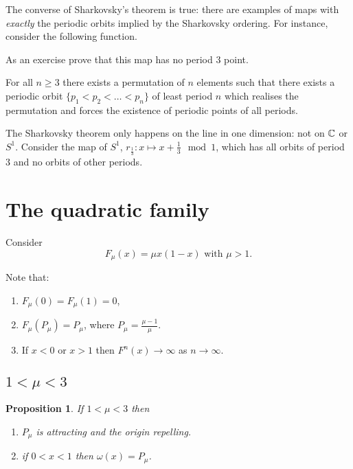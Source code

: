 \documentclass{notes}
\theoremstyle{plain}
\newtheorem{proposition}{Proposition}[chapter]
\begin{document}
The converse of Sharkovsky's theorem is true: there are examples of
maps with \emph{exactly} the periodic orbits implied by the Sharkovsky
ordering.  For instance, consider the following function.

\vspace{1.5in}

As an exercise prove that this map has no period 3 point.

For all $n \ge 3$ there exists a permutation of $n$ elements such that
there exists a periodic orbit $\{ p_1 < p_2 < \dots < p_n \}$ of least
period $n$ which realises the permutation and forces the existence of
periodic points of all periods.

The Sharkovsky theorem only happens on the line in one dimension: not
on $\mathbb{C}$ or $S^1$.  Consider the map of $S^1$, $r_{\frac{1}{3}} \colon
x \mapsto x+ \tfrac{1}{3} \mod{1}$, which has all orbits of period $3$
and no orbits of other periods.

\section{The quadratic family}

Consider
\[
F_\mu(x) = \mu x (1-x) \text{ with } \mu > 1.
\]

Note that:

\begin{enumerate}
\item $F_\mu(0) = F_\mu(1) = 0$,
\item $F_\mu(P_\mu) = P_\mu$, where $P_\mu = \tfrac{\mu - 1}{\mu}$.
\item If $x < 0$ or $x > 1$ then $F^n(x) \to \infty$ as $n \to \infty$.
\end{enumerate}

\subsection{$1 < \mu < 3$}

\begin{proposition}
If $1 < \mu < 3$ then
\begin{enumerate}
\item $P_\mu$ is attracting and the origin repelling.
\item if $0 < x < 1$ then $\omega(x) = P_\mu$.
\end{enumerate}
\end{proposition}
\end{document}
